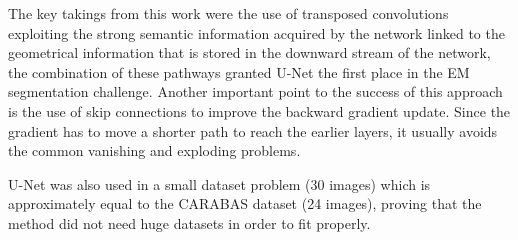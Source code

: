 The key takings from this work were the use of transposed convolutions exploiting the strong semantic information acquired by the network linked to the geometrical information that is stored in the downward stream of the network, the combination of these pathways granted U-Net the first place in the EM segmentation challenge. Another important point to the success of this approach is the use of skip connections to improve the backward gradient update. Since the gradient has to move a shorter path to reach the earlier layers, it usually avoids the common vanishing and exploding problems.

U-Net was also used in a small dataset problem (30 images) which is approximately equal to the CARABAS dataset (24 images), proving that the method did not need huge datasets in order to fit properly.